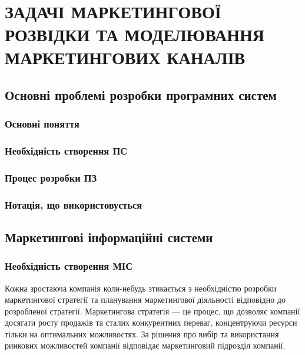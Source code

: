 ﻿\section{ЗАДАЧІ МАРКЕТИНГОВОЇ РОЗВІДКИ ТА МОДЕЛЮВАННЯ МАРКЕТИНГОВИХ КАНАЛІВ}
%
\subsection{Основні проблемі розробки програмних систем}
\subsubsection{Основні поняття}
\subsubsection{Необхідність створення ПС}
\subsubsection{Процес розробки ПЗ}
\subsubsection{Нотація, що використовується}

\subsection{Маркетингові інформаційні системи}
\subsubsection{Необхідність створення МІС}
Кожна зростаюча компанія коли-небудь зтикається з необхідністю розробки маркетингової стратегії та планування маркетингової діяльності відповідно до розробленої стратегії. Маркетингова стратегія --- це процес, що дозволяє компанії досягати росту продажів та сталих конкурентних переваг, концентруючи ресурси тільки на оптимальних можливостях\cite{baker}. За рішення про вибір та використання ринкових можливостей компанії відповідає маркетинговий підрозділ компанії. 
 

